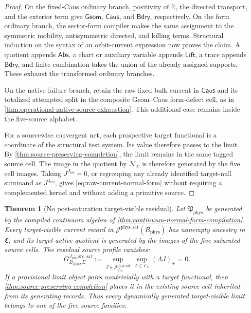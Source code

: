 \documentclass[11pt]{article}
\numberwithin{section}{part}
\theoremstyle{plain}
\newtheorem{theorem}{Theorem}[section]
\theoremstyle{definition}
\theoremstyle{remark}
\newcommand{\Geom}{\mathsf{Geom}}
\newcommand{\Caus}{\mathsf{Caus}}
\newcommand{\Abs}{\mathsf{Abs}}
\newcommand{\Lift}{\mathsf{Lift}}
\newcommand{\Bdry}{\mathsf{Bdry}}
\newcommand{\Res}{J_{\mathrm{res}}}
\newcommand{\Channels}{\mathfrak C}
\newcommand{\Null}{\mathscr N}
\newcommand{\Phys}{\mathrm{phys}}
\newcommand{\Sat}{\mathrm{sat}}
\newcommand{\Budget}{B_{\Phys}}
\begin{document}
\begin{proof}
On the fixed-Caus ordinary branch, positivity of \(\mathbb K\), the directed
transport, and the exterior term give \(\Geom\), \(\Caus\), and \(\Bdry\),
respectively.  On the form ordinary branch, the sector-form compiler makes the same
assignment to the symmetric mobility, antisymmetric directed, and killing
terms.  Structural induction on the syntax
of an orbit-current expression now proves the claim.  A quotient appends
\(\Abs\), a chart or auxiliary variable appends \(\Lift\), a trace appends
\(\Bdry\), and finite combination takes the union of the already assigned
supports.  These exhaust the transformed ordinary branches.

On the native failure branch, retain the raw fixed bulk current in \(\Caus\)
and its totalized attempted split in the composite Geom--Caus form-defect
cell, as in \cref{thm:operational-native-source-exhaustion}.  This additional
case remains inside the five-source alphabet.

For a sourcewise convergent net, each prospective target functional is a
coordinate of the structural test system.  Its value therefore passes to the
limit.  By \cref{thm:source-preserving-completion}, the limit remains in the
same tagged source cell.  The image in the quotient by \(\Null_\Sigma\) is
therefore generated by the five cell images.  Taking \(J^{\Res}=0\), or
regrouping any already identified target-null summand as \(J^{\Res}\), gives
\eqref{eq:raw-current-normal-form} without requiring a complemented kernel
and without adding a primitive source.
\end{proof}

\begin{theorem}[No post-saturation target-visible residual]
\label{thm:no-target-visible-residual}
Let \(\mathfrak P_{\Phys}\) be generated by the compiled continuum algebra
of \cref{thm:continuum-normal-form-compilation}.  Every target-visible current
record in \(\mathscr J^{\Phys,\Sat}(\Budget)\) has nonempty ancestry in
\(\Channels\), and its target-active quotient is generated by the images of
the five saturated source cells.  The residual source profile vanishes:
\begin{equation}
 \label{eq:zero-residual-source-profile}
 G_{\Budget,\Sigma}^{\Res,\mathrm{src},\Sat}
 :=\sup_{J\in\mathscr J_{\Res}^{\Phys,\Sat}}
   \sup_{\Lambda\in\Gamma_\Sigma}(\Lambda J)_+
 =0.
\end{equation}
If a provisional limit object pairs nontrivially with a target functional,
then \cref{thm:source-preserving-completion} places it in the existing source
cell inherited from its generating records.  Thus every dynamically generated
target-visible limit belongs to one of the five source families.
\end{theorem}
\end{document}
